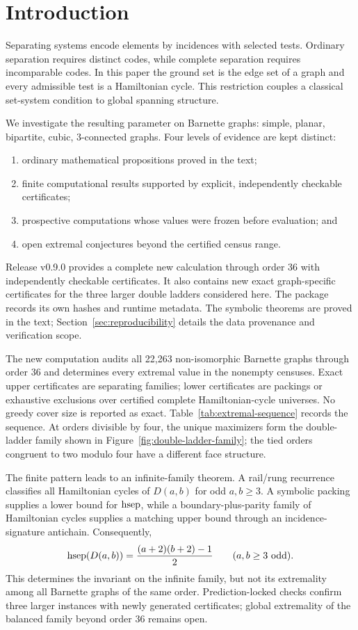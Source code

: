\section{Introduction}
\label{sec:introduction}

Separating systems encode elements by incidences with selected tests.
Ordinary separation requires distinct codes, while complete separation
requires incomparable codes.  In this paper the ground set is the edge set of
a graph and every admissible test is a Hamiltonian cycle.  This restriction
couples a classical set-system condition to global spanning structure.

We investigate the resulting parameter on Barnette graphs: simple, planar,
bipartite, cubic, 3-connected graphs.  Four levels of evidence are kept
distinct:
\begin{enumerate}[label=(\roman*)]
  \item ordinary mathematical propositions proved in the text;
  \item finite computational results supported by explicit, independently
        checkable certificates;
  \item prospective computations whose values were frozen before evaluation;
        and
  \item open extremal conjectures beyond the certified census range.
\end{enumerate}

Release v0.9.0 provides a complete new calculation through order 36 with
independently checkable certificates.  It also contains new exact
graph-specific certificates for the three larger double ladders considered
here.  The package records its own hashes and runtime metadata.  The
symbolic theorems are proved in the text; Section~\ref{sec:reproducibility}
details the data provenance and verification scope.

The new computation audits all 22,263 non-isomorphic Barnette graphs through
order 36 and determines every extremal value in the nonempty censuses.  Exact upper
certificates are separating families; lower certificates are packings or
exhaustive exclusions over certified complete Hamiltonian-cycle universes.
No greedy cover size is reported as exact.  Table~\ref{tab:extremal-sequence}
records the sequence.  At orders divisible by four, the unique maximizers form
the double-ladder family shown in Figure~\ref{fig:double-ladder-family}; the
tied orders congruent to two modulo four have a different face structure.

The finite pattern leads to an infinite-family theorem.  A rail/rung
recurrence classifies all Hamiltonian cycles of \(D(a,b)\) for odd
\(a,b\ge3\).  A symbolic packing supplies a lower bound for \(\operatorname{hsep}\), while a
boundary-plus-parity family of Hamiltonian cycles supplies a matching upper
bound through an incidence-signature antichain.  Consequently,
\[
 \operatorname{hsep}(D(a,b))=\frac{(a+2)(b+2)-1}{2}
 \qquad(a,b\ge3\text{ odd}).
\]
This determines the invariant on the infinite family, but not its extremality
among all Barnette graphs of the same order.  Prediction-locked checks confirm
three larger instances with newly generated certificates; global extremality
of the balanced family beyond order 36 remains open.


